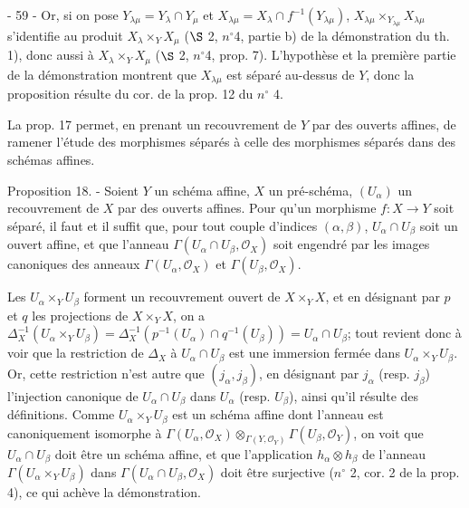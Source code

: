 \newpage


- 59 -
Or, si on pose $Y_{\lambda\mu} = Y_\lambda \cap Y_\mu$ et $X_{\lambda\mu} = X_\lambda \cap f^{-1}(Y_{\lambda\mu})$, $X_{\lambda\mu} \times_{Y_{\lambda\mu}} X_{\lambda\mu}$ s'identifie au produit $X_\lambda \times_Y X_\mu$ ($\S$ 2, $n^\circ$4, partie b) de la démonstration du th. 1), donc aussi à $X_\lambda \times_Y X_\mu$ ($\S$ 2, $n^\circ$4, prop. 7). L'hypothèse et la première partie de la démonstration montrent que $X_{\lambda\mu}$ est séparé au-dessus de $Y$, donc la proposition résulte du cor. de la prop. 12 du $n^\circ$ 4.

La prop. 17 permet, en prenant un recouvrement de $Y$ par des ouverts affines, de ramener l'étude des morphismes séparés à celle des morphismes séparés dans des schémas affines.

Proposition 18. - Soient $Y$ un schéma affine, $X$ un pré-schéma, $(U_\alpha)$ un recouvrement de $X$ par des ouverts affines. Pour qu'un morphisme $f : X \to Y$ soit séparé, il faut et il suffit que, pour tout couple d'indices $(\alpha, \beta)$, $U_\alpha \cap U_\beta$ soit un ouvert affine, et que l'anneau $\Gamma(U_\alpha \cap U_\beta, \mathcal{O}_X)$ soit engendré par les images canoniques des anneaux $\Gamma(U_\alpha, \mathcal{O}_X)$ et $\Gamma(U_\beta, \mathcal{O}_X)$.

Les $U_\alpha \times_Y U_\beta$ forment un recouvrement ouvert de $X \times_Y X$, et en désignant par $p$ et $q$ les projections de $X \times_Y X$, on a $\Delta_X^{-1}(U_\alpha \times_Y U_\beta) = \Delta_X^{-1}(p^{-1}(U_\alpha) \cap q^{-1}(U_\beta)) = U_\alpha \cap U_\beta$; tout revient donc à voir que la restriction de $\Delta_X$ à $U_\alpha \cap U_\beta$ est une immersion fermée dans $U_\alpha \times_Y U_\beta$. Or, cette restriction n'est autre que $(j_\alpha, j_\beta)$, en désignant par $j_\alpha$ (resp. $j_\beta$) l'injection canonique de $U_\alpha \cap U_\beta$ dans $U_\alpha$ (resp. $U_\beta$), ainsi qu'il résulte des définitions. Comme $U_\alpha \times_Y U_\beta$ est un schéma affine dont l'anneau est canoniquement isomorphe à $\Gamma(U_\alpha, \mathcal{O}_X) \otimes_{\Gamma(Y, \mathcal{O}_Y)} \Gamma(U_\beta, \mathcal{O}_Y)$, on voit que $U_\alpha \cap U_\beta$ doit être un schéma affine, et que l'application $h_\alpha \otimes h_\beta$ de l'anneau $\Gamma(U_\alpha \times_Y U_\beta)$ dans $\Gamma(U_\alpha \cap U_\beta, \mathcal{O}_X)$ doit être surjective ($n^\circ$ 2, cor. 2 de la prop. 4), ce qui achève la démonstration.

